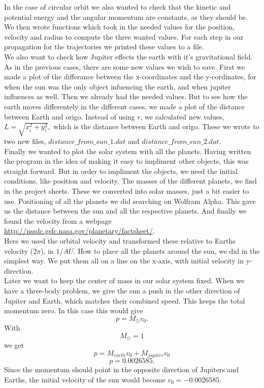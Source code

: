 \documentclass[a4paper,12pt, english]{article}
\begin{document}
In the case of circular orbit we also wanted to check that the kinetic and potential energy and the angular momentum are constants, as they should be. We then wrote functions which took in the needed values for the position, velocity and radius to compute the three wanted values. For each step in our propagation for the trajectories we printed these values to a file.\\  

We also want to check how Jupiter effects the earth with it's gravitational field. 
As in the previous cases, there are some new values we wish to save. First we made a plot of the differance between the x-coordinates and the y-cordinates, for when the sun was the only object infuencing the earth, and when jupiter influences as well. Then we already had the needed values. But to see how the earth moves differentely in the different cases, we made a plot of the distance between Earth and origo. Instead of using $r$, we calculated new values, $L = \sqrt{x_i^2 + y_i^2},$ which is the distance between Earth and origo. 
These we wrote to two new files, $distance\_from\_sun\_1.dat$ and $distance\_from\_sun\_2.dat.$ \\

Finally we wanted to plot the solar system with all the planets. Having written the program in the idea of making it easy to impliment other objects, this was straight forward. But in order to impliment the objects, we need the initial conditions, like position and velocity. The masses of the different planets, we find in the project sheets. These we converted into solar masses, just a bit easier to use. Positioning of all the planets we did searching on Wolfram Alpha. This gave us the distance between the sun and all the respective planets.  
And finally we found the velocity from a webpage \url{http://nssdc.gsfc.nasa.gov/planetary/factsheet/}.\\

Here we used the orbital velocity and transformed these relative to Earths velocity ($2\pi$), in $1/AU.$ 
How to place all the planets around the sun, we did in the simplest way. We put them all on a line on the x-axis, with initial velocity in y-direction. \\

Later we want to keep the center of mass in our solar system fixed. When we have a three-body problem, we give the sun a push in the other direction of Jupiter and Earth, which matches their combined speed. This keeps the total momentum zero. In this case this would give
$$p = M_{\odot}v_0.$$
With 
$$M_{\odot} = 1$$ 
we get 
$$p = M_{earth}v_0 + M_{jupiter}v_0$$
$$p = 0.0026585.$$   
Since the momentum should point in the opposite direction of Jupiters and Earths, the initial velocity of the sun would become $v_0 = -0.0026585.$ 
\end{document}
